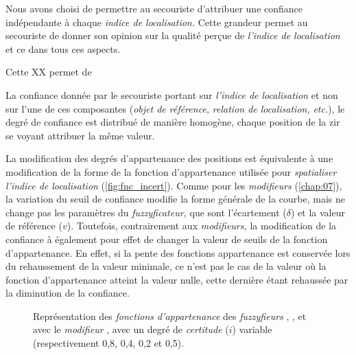 Nous avons choisi de permettre au secouriste d'attribuer une confiance
indépendante à chaque \emph{indice de localisation.} Cette grandeur
permet au secouriste de donner son opinion sur la qualité perçue de
\emph{l'indice de localisation} et ce dans tous ces aspects.

Cette XX permet de 


La confiance donnée par le secouriste portant sur \emph{l'indice de
  localisation} et non sur l'une de ces composantes (\eg \emph{objet
  de référence,} \emph{relation de localisation,} \emph{etc.}), le
degré de confiance est distribué de manière homogène, chaque position
de la \ac{zir} se voyant attribuer la même valeur.


La modification des degrés d'appartenance des positions est
équivalente à une modification de la forme de la fonction
d'appartenance utilisée pour \emph{spatialiser l'indice de
  localisation} (\autoref{fig:fnc_incert}). Comme pour les
\emph{modifieurs} (\autoref{chap:07}), la variation du seuil de
confiance modifie la forme générale de la courbe, mais ne change pas
les paramètres du \emph{fuzzyficateur,} que sont l'écartement
(\(\delta\)) et la valeur de référence (\(v\)). Toutefois,
contrairement aux \emph{modifieurs,} la modification de la confiance à
également pour effet de changer la valeur de seuils de la fonction
d'appartenance. En effet, si la pente des fonctions appartenance est
conservée lors du rehaussement de la valeur minimale, ce n'est pas le
cas de la valeur où la fonction d'appartenance atteint la valeur
nulle, cette dernière étant rehaussée par la diminution de la
confiance.

\begin{figure}
  \centering  \subfloat[\label{fig:fnc_app_inc}]{}\hfill
  \subfloat[\label{fig:fnc_app_inc_2}]{}

  \subfloat[\label{fig:fnc_app_inc_3}]{}\hfill
  \subfloat[\label{fig:fnc_app_inc_4}]{}
  \caption[Représentation des \emph{fonctions d'appartenance} de
  différents \emph{fuzzyfieurs} avec une
  \emph{incertitude}]{Représentation des \emph{fonctions
      d'appartenance} des \emph{fuzzyfieurs}
    \protect{} \protect{},
    \protect{} \protect{},
    \protect{} \protect{}
    et \protect{} avec le \emph{modifieur}
    \protect{} \protect{}, avec
    un degré de \emph{certitude} (\(i\)) variable (respectivement
    0,8, 0,4, 0,2 et 0,5).}
  \label{fig:fnc_incert}
\end{figure}

